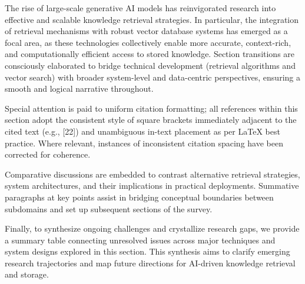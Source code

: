 \documentclass[sigconf]{acmart}
\begin{document}
The rise of large-scale generative AI models has reinvigorated research into effective and scalable knowledge retrieval strategies. In particular, the integration of retrieval mechanisms with robust vector database systems has emerged as a focal area, as these technologies collectively enable more accurate, context-rich, and computationally efficient access to stored knowledge. Section transitions are consciously elaborated to bridge technical development (retrieval algorithms and vector search) with broader system-level and data-centric perspectives, ensuring a smooth and logical narrative throughout.

Special attention is paid to uniform citation formatting; all references within this section adopt the consistent style of square brackets immediately adjacent to the cited text (e.g., [22]) and unambiguous in-text placement as per LaTeX best practice. Where relevant, instances of inconsistent citation spacing have been corrected for coherence.

Comparative discussions are embedded to contrast alternative retrieval strategies, system architectures, and their implications in practical deployments. Summative paragraphs at key points assist in bridging conceptual boundaries between subdomains and set up subsequent sections of the survey.

Finally, to synthesize ongoing challenges and crystallize research gaps, we provide a summary table connecting unresolved issues across major techniques and system designs explored in this section. This synthesis aims to clarify emerging research trajectories and map future directions for AI-driven knowledge retrieval and storage.
\end{document}
